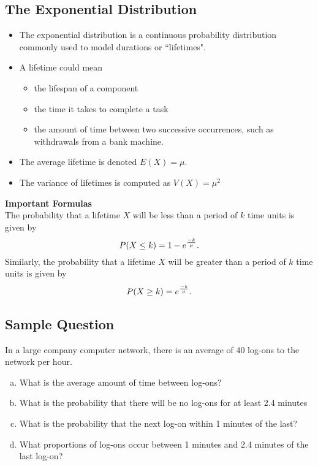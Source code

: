 \documentclass[a4paper,12pt]{article}
\begin{document}
\large 
\subsection*{The Exponential Distribution}
\begin{itemize}
\item The exponential distribution is a continuous probability distribution commonly used to model durations or ``lifetimes".
\item A lifetime could mean
\begin{itemize}
\large
\item the lifespan of a component
\item the time it takes to complete a task
\item the amount of time between two successive occurrences, such as withdrawals from a bank machine.
\end{itemize}
\item The average lifetime is denoted $E(X) = \mu$.
\item The variance of lifetimes is computed as $V(X) = \mu^2$
\end{itemize}


\begin{framed}
\noindent \textbf{Important Formulas}\\
\large
The probability that a lifetime $X$ will be less than a period of $k$ time units is given by
\[
P( X \leq k) = 1- e^{{-k \over \mu}}.
\]
Similarly, the probability that a lifetime $X$ will be greater than a period of $k$ time units is given by
\[
P( X \geq k) = e^{{-k \over \mu}}.
\]
\end{framed}
\newpage 
\subsection*{Sample Question}
\large
In a large company computer network, there is an average of 40 log-ons to the network per hour.
\begin{enumerate}[(a)]
\item What is the average amount of time between log-ons?
\item What is the probability that there will be no log-ons for at least 2.4 minutes
\item What is the probability that the next log-on within 1 minutes of the last?
\item What proportions of log-ons occur between 1 minutes and 2.4 minutes of the last log-on?
\end{enumerate}
\end{document}
